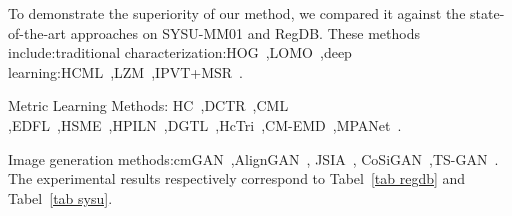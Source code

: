 \documentclass[journal]{IEEEtran}
\begin{document}
To demonstrate the superiority of our method, we compared it against the state-of-the-art approaches on SYSU-MM01 and RegDB. These methods include:traditional characterization:HOG~\cite{dalal2005histograms},LOMO~\cite{liao2015person},deep learning:HCML~\cite{ye2018hierarchical},LZM~\cite{basaran2020efficient},IPVT+MSR~\cite{kang2019person}.

Metric Learning Methods: HC~\cite{zhu2020hetero},DCTR~\cite{ye2018visible},CML~\cite{ling2020class}
,EDFL~\cite{liu2020enhancing},HSME~\cite{hao2019hsme},HPILN~\cite{zhao2019hpiln},DGTL~\cite{liu2021strong},HcTri~\cite{liu2020parameter},CM-EMD~\cite{ling2022cross},MPANet~\cite{wu2021discover}.

Image generation methods:cmGAN~\cite{dai2018cross},AlignGAN~\cite{wang2019rgb},
JSIA~\cite{wang2020cross}, CoSiGAN~\cite{zhong2020visible},TS-GAN~\cite{zhang2021rgb}.
The experimental results respectively correspond to Tabel~\ref{tab regdb} and Tabel~\ref{tab sysu}.
\end{document}
